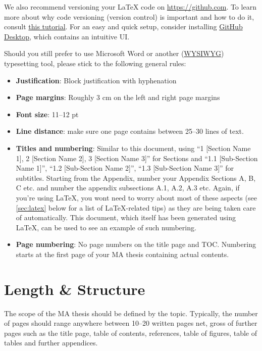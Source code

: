 We also recommend versioning your \LaTeX{} code on \url{https://github.com}. To learn more about why code versioning (version control) is important and how to do it, consult \href{https://docs.github.com/en/get-started/start-your-journey/about-github-and-git}{this tutorial}. For an easy and quick setup, consider installing \href{https://desktop.github.com/download/}{GitHub Desktop}, which contains an intuitive \gls{UI}.

Should you still prefer to use Microsoft Word or another (\href{https://de.wikipedia.org/wiki/WYSIWYG}{WYSIWYG}) typesetting tool, please stick to the following general rules:

\begin{itemize}
	\item \textbf{Justification}: Block justification with hyphenation
	\item \textbf{Page margins}: Roughly 3 cm on the left and right page margins
	\item \textbf{Font size}: 11--12 pt
	\item \textbf{Line distance}: make sure one page contains between 25--30 lines of text.
	\item \textbf{Titles and numbering}: Similar to this document, using \enquote{1 [Section Name 1], 2  [Section Name 2], 3  [Section Name 3]} for Sections and  \enquote{1.1 [Sub-Section Name 1]}, \enquote{1.2 [Sub-Section Name 2]}, \enquote{1.3 [Sub-Section Name 3]} for subtitles. Starting from the Appendix, number your Appendix Sections A, B, C etc. and number the appendix subsections A.1, A.2, A.3 etc. Again, if you're using \LaTeX, you wont need to worry about most of these aspects (see \cref{sec:latex} below for a list of LaTeX-related tips) as they are being taken care of automatically. This document, which itself has been generated using \LaTeX, can be used to see an example of such numbering.
	\item \textbf{Page numbering}: No page numbers on the title page and \gls{TOC}. Numbering starts at the first page of your \gls{MA} thesis containing actual contents.
\end{itemize}


\section{Length \& Structure}

The scope of the MA thesis should be defined by the topic. Typically, the number of pages should range anywhere between 10--20 written pages net, gross of further pages such as the title page, table of contents, references, table of figures, table of tables and further appendices.

